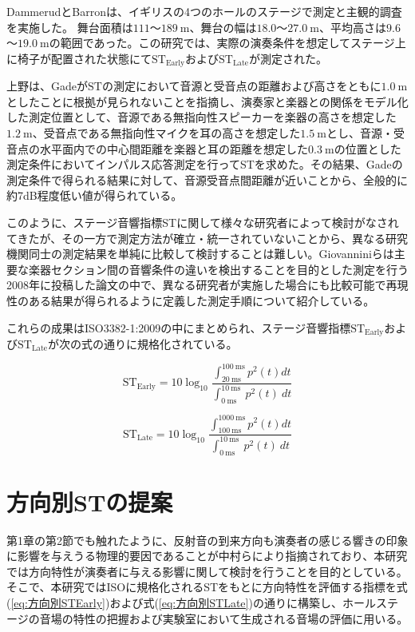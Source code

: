 \documentclass[11pt,a4j]{jreport}
\begin{document}
DammerudとBarron\cite{dammerud2007}は、イギリスの4つのホールのステージで測定と主観的調査を実施した。 舞台面積は$111$～$\SI{189}{\m}$、舞台の幅は$18.0$～$\SI{27.0}{\m}$、平均高さは$9.6$～$\SI{19.0}{\m}$の範囲であった。この研究では、実際の演奏条件を想定してステージ上に椅子が配置された状態にて$\mathrm{ST_{Early}}$および$\mathrm{ST_{Late}}$が測定された。

上野\cite{Ueno2002}は、Gadeが$\mathrm{ST}$の測定において音源と受音点の距離および高さをともに$\SI{1.0}{\m}$としたことに根拠が見られないことを指摘し、演奏家と楽器との関係をモデル化した測定位置として、音源である無指向性スピーカーを楽器の高さを想定した$\SI{1.2}{\m}$、受音点である無指向性マイクを耳の高さを想定した$\SI{1.5}{\m}$とし、音源・受音点の水平面内での中心間距離を楽器と耳の距離を想定した$\SI{0.3}{\m}$の位置とした測定条件においてインパルス応答測定を行ってSTを求めた。その結果、Gadeの測定条件で得られる結果に対して、音源受音点間距離が近いことから、全般的に約7dB程度低い値が得られている。

このように、ステージ音響指標STに関して様々な研究者によって検討がなされてきたが、その一方で測定方法が確立・統一されていないことから、異なる研究機関同士の測定結果を単純に比較して検討することは難しい。Giovannini\cite{giovannini2010}らは主要な楽器セクション間の音響条件の違いを検出することを目的とした測定を行う2008年に投稿した論文の中で、異なる研究者が実施した場合にも比較可能で再現性のある結果が得られるように定義した測定手順について紹介している。

これらの成果はISO3382-1:2009\cite{ISO3382-1}の中にまとめられ、ステージ音響指標$\mathrm{ST_{Early}}$および$\mathrm{ST_{Late}}$が次の式の通りに規格化されている。

\begin{equation}
  \label{eq:STEarly}
  \mathrm{ST_{Early}}= 10 \log_{10}
  \frac{\int_{20 \: \mathrm{ms}}^{100 \: \mathrm{ms}} p^2(t) dt}
  {\int_{0 \: \mathrm{ms}}^{10 \: \mathrm{ms}} \: p^2(t) \: dt}
\end{equation}

\begin{equation}
  \label{eq:STLate}
  \mathrm{ST_{Late}}= 10 \log_{10}
  \frac{\int_{100 \: \mathrm{ms}}^{1000 \: \mathrm{ms}} p^2(t) dt}
  {\int_{0 \: \mathrm{ms}}^{10 \: \mathrm{ms}} \: p^2(t) \: dt}
\end{equation}
\newpage
\section{方向別STの提案}
第1章の第2節でも触れたように、反射音の到来方向も演奏者の感じる響きの印象に影響を与えうる物理的要因であることが中村ら\cite{中村1993}により指摘されており、本研究では方向特性が演奏者に与える影響に関して検討を行うことを目的としている。そこで、本研究ではISOに規格化されるSTをもとに方向特性を評価する指標を式(\ref{eq:方向別STEarly})および式(\ref{eq:方向別STLate})の通りに構築し、ホールステージの音場の特性の把握および実験室において生成される音場の評価に用いる。
\end{document}
